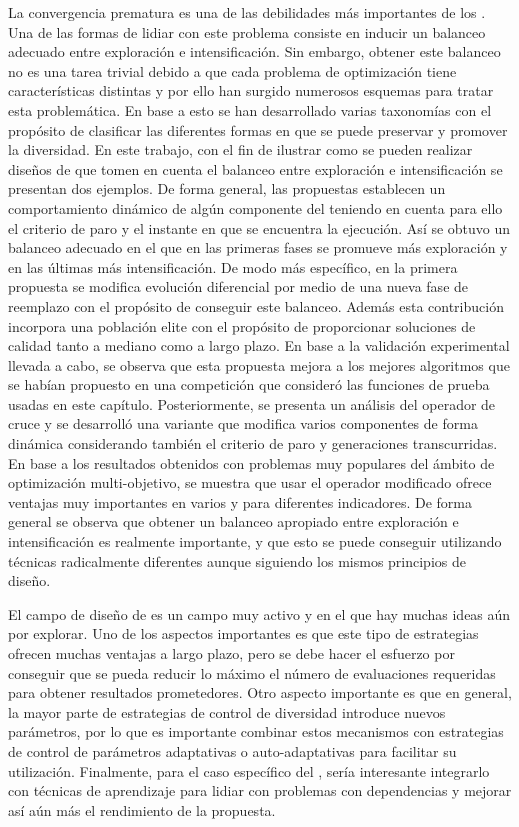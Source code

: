 La convergencia prematura es una de las debilidades más importantes de los \EAS{}.
%
Una de las formas de lidiar con este problema consiste en inducir un balanceo adecuado entre exploración e intensificación.
%
Sin embargo, obtener este balanceo no es una tarea trivial debido a que cada problema de optimización tiene características distintas y por
ello han surgido numerosos esquemas para tratar esta problemática.
%
En base a esto se han desarrollado varias taxonomías con el propósito de clasificar las diferentes formas en que se puede preservar y promover la diversidad.
%
En este trabajo, con el fin de ilustrar como se pueden realizar diseños de \EAS{} que tomen en cuenta el balanceo entre exploración e intensificación
se presentan dos ejemplos.
%
De forma general, las propuestas establecen un comportamiento dinámico de algún componente del \EA{} teniendo en cuenta para ello el criterio de paro 
y el instante en que se encuentra la ejecución.
%
Así se obtuvo un balanceo adecuado en el que en las primeras fases se promueve más exploración y en las últimas más intensificación. 
%
De modo más específico, en la primera propuesta se modifica evolución diferencial por medio de una nueva fase de reemplazo con el propósito de conseguir este balanceo. 
%
Además esta contribución incorpora una población elite con el propósito de proporcionar soluciones de calidad tanto a mediano como a largo plazo.
%
En base a la validación experimental llevada a cabo, se observa que esta propuesta mejora a los mejores algoritmos que se habían propuesto en una competición
que consideró las funciones de prueba usadas en este capítulo.
%
Posteriormente, se presenta un análisis del operador de cruce \SBX{} y se desarrolló una variante que modifica varios componentes de forma dinámica
considerando también el criterio de paro y generaciones transcurridas. 
%
En base a los resultados obtenidos con problemas muy populares del ámbito de optimización multi-objetivo, se muestra que usar el operador \SBX{} modificado ofrece ventajas muy importantes
en varios \MOEAS{} y para diferentes indicadores.
%
De forma general se observa que obtener un balanceo apropiado entre exploración e intensificación es realmente importante, y que
esto se puede conseguir utilizando técnicas radicalmente diferentes aunque siguiendo los mismos principios de diseño.

El campo de diseño de \EAS{} es un campo muy activo y en el que hay muchas ideas aún por explorar.
%
Uno de los aspectos importantes es que este tipo de estrategias ofrecen muchas ventajas a largo plazo, pero se debe hacer el esfuerzo por conseguir
que se pueda reducir lo máximo el número de evaluaciones requeridas para obtener resultados prometedores.
%
Otro aspecto importante es que en general, la mayor parte de estrategias de control de diversidad introduce nuevos parámetros, por lo que es importante
combinar estos mecanismos con estrategias de control de parámetros adaptativas o auto-adaptativas para facilitar su utilización.
%
Finalmente, para el caso específico del \DSBX{}, sería interesante integrarlo con técnicas de aprendizaje para lidiar con problemas con dependencias y mejorar
así aún más el rendimiento de la propuesta.
